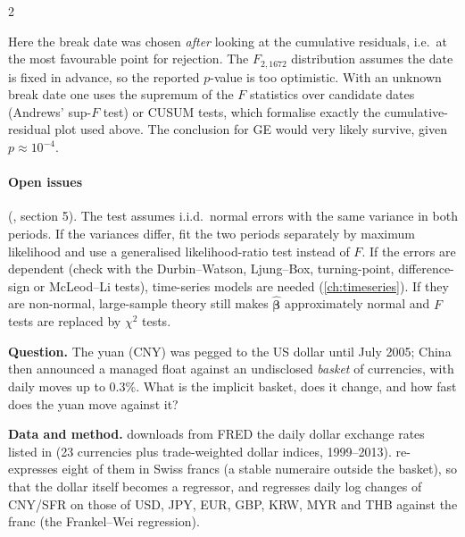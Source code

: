 \begin{paracol}{2}
\begin{coursenote}
Here the break date was chosen \emph{after} looking at the cumulative residuals, i.e.\ at the most favourable point
for rejection. The $F_{2,1672}$ distribution assumes the date is fixed in advance, so the reported $p$-value is too
optimistic. With an unknown break date one uses the supremum of the $F$ statistics over candidate dates (Andrews'
sup-$F$ test) or CUSUM tests, which formalise exactly the cumulative-residual plot used above. The
conclusion for GE would very likely survive, given $p\approx10^{-4}$.
\end{coursenote}

\paragraph{Open issues} (, section 5). The test assumes i.i.d.\ normal errors with the same variance in
both periods. If the variances differ, fit the two periods separately by maximum likelihood and use a
generalised likelihood-ratio test instead of $F$. If the errors are dependent (check with the Durbin--Watson,
Ljung--Box, turning-point, difference-sign or McLeod--Li tests), time-series models are needed
(\cref{ch:timeseries}). If they are non-normal, large-sample theory still makes $\hat{\bm\beta}$ approximately normal and
$F$ tests are replaced by $\chi^2$ tests.

\begin{casestudy}
\textbf{Question.} The yuan (CNY) was pegged to the US dollar until July 2005; China then announced a managed float
against an undisclosed \emph{basket} of currencies, with daily moves up to 0.3\%. What is the implicit basket, does it
change, and how fast does the yuan move against it?

\textbf{Data and method.}  downloads from FRED the daily dollar exchange rates listed in
 (23 currencies plus trade-weighted dollar indices, 1999--2013).
 re-expresses eight of them in Swiss francs (a stable numeraire outside the basket), so
that the dollar itself becomes a regressor, and regresses daily log changes of CNY/SFR on those of USD, JPY, EUR,
GBP, KRW, MYR and THB against the franc (the Frankel--Wei regression).


\end{casestudy}
\end{paracol}
